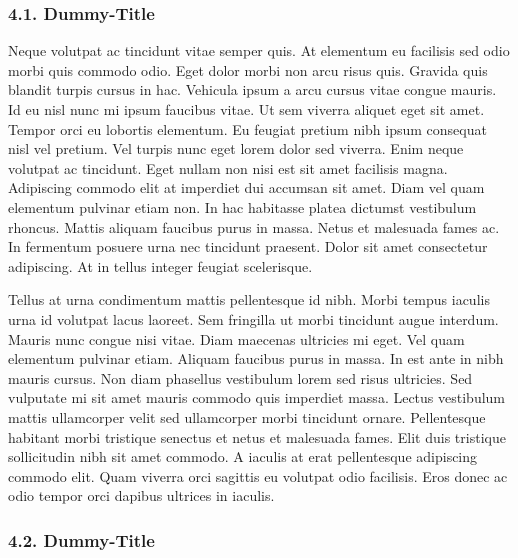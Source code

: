 \documentclass[
]{article}
\begin{document}
\hypertarget{dummy-title-3}{%
\subsubsection{4.1. Dummy-Title}\label{dummy-title-3}}

Neque volutpat ac tincidunt vitae semper quis. At elementum eu facilisis
sed odio morbi quis commodo odio. Eget dolor morbi non arcu risus quis.
Gravida quis blandit turpis cursus in hac. Vehicula ipsum a arcu cursus
vitae congue mauris. Id eu nisl nunc mi ipsum faucibus vitae. Ut sem
viverra aliquet eget sit amet. Tempor orci eu lobortis elementum. Eu
feugiat pretium nibh ipsum consequat nisl vel pretium. Vel turpis nunc
eget lorem dolor sed viverra. Enim neque volutpat ac tincidunt. Eget
nullam non nisi est sit amet facilisis magna. Adipiscing commodo elit at
imperdiet dui accumsan sit amet. Diam vel quam elementum pulvinar etiam
non. In hac habitasse platea dictumst vestibulum rhoncus. Mattis aliquam
faucibus purus in massa. Netus et malesuada fames ac. In fermentum
posuere urna nec tincidunt praesent. Dolor sit amet consectetur
adipiscing. At in tellus integer feugiat scelerisque.

Tellus at urna condimentum mattis pellentesque id nibh. Morbi tempus
iaculis urna id volutpat lacus laoreet. Sem fringilla ut morbi tincidunt
augue interdum. Mauris nunc congue nisi vitae. Diam maecenas ultricies
mi eget. Vel quam elementum pulvinar etiam. Aliquam faucibus purus in
massa. In est ante in nibh mauris cursus. Non diam phasellus vestibulum
lorem sed risus ultricies. Sed vulputate mi sit amet mauris commodo quis
imperdiet massa. Lectus vestibulum mattis ullamcorper velit sed
ullamcorper morbi tincidunt ornare. Pellentesque habitant morbi
tristique senectus et netus et malesuada fames. Elit duis tristique
sollicitudin nibh sit amet commodo. A iaculis at erat pellentesque
adipiscing commodo elit. Quam viverra orci sagittis eu volutpat odio
facilisis. Eros donec ac odio tempor orci dapibus ultrices in iaculis.

\hypertarget{dummy-title-4}{%
\subsubsection{4.2. Dummy-Title}\label{dummy-title-4}}
\end{document}
